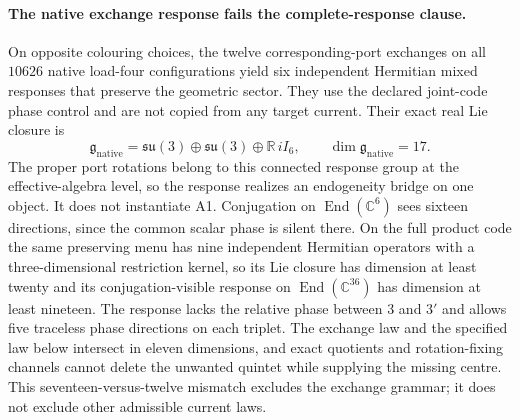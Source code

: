 \documentclass[11pt]{article}
\begin{document}
\paragraph{The native exchange response fails the complete-response clause.}
On opposite colouring choices, the twelve corresponding-port exchanges on all
\(10626\) native load-four configurations yield six independent Hermitian
mixed responses that preserve the geometric sector. They use the declared
joint-code phase control and are not copied from any target current. Their
exact real Lie closure is
\[
 \mathfrak g_{\mathrm{native}}
 =\mathfrak{su}(3)\oplus\mathfrak{su}(3)\oplus\mathbb R\,iI_6,
 \qquad \dim\mathfrak g_{\mathrm{native}}=17.
\]
The proper port rotations belong to this connected response group at the
effective-algebra level, so the response realizes an endogeneity bridge on
one object. It does not instantiate A1. Conjugation on
\(\operatorname{End}(\mathbb C^6)\) sees sixteen directions, since the common
scalar phase is silent there. On the full product code the same preserving
menu has nine independent Hermitian operators with a three-dimensional
restriction kernel, so its Lie closure has dimension at least twenty and its
conjugation-visible response on \(\operatorname{End}(\mathbb C^{36})\) has
dimension at least nineteen. The response lacks the relative phase between
\(3\) and \(3'\) and allows five traceless phase directions on each triplet.
The exchange law and the specified law below intersect in eleven dimensions,
and exact quotients and rotation-fixing channels cannot delete the unwanted
quintet while supplying the missing centre. This seventeen-versus-twelve
mismatch excludes the exchange grammar; it does not exclude other admissible
current laws.
\end{document}
